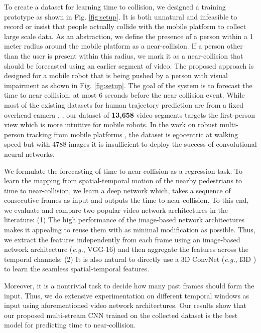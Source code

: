 To create a dataset for learning time to collision, we designed a training prototype as shown in Fig. \ref{fig:setup}. It is both unnatural and infeasible to record or insist that people actually collide with the mobile platform to collect large scale data. As an abstraction, we define the presence of a person within a 1 meter radius around the mobile platform as a near-collision. If a person other than the user is present within this radius, we mark it as a near-collision that should be forecasted using an earlier segment of video. The proposed approach is designed for a mobile robot that is being pushed by a person with visual impairment as shown in Fig. \ref{fig:setup}. The goal of the system is to forecast the time to near collision, at most 6 seconds before the near collision event. While most of the existing datasets for human trajectory prediction are from a fixed overhead camera \cite{2009YoullNW}, \cite{UCY}, our dataset of \textbf{13,658} video segments targets the first-person view which is more intuitive for mobile robots. In the work on robust multi-person tracking from mobile platforms \cite{Andreas}, the dataset is egocentric at walking speed but with 4788 images it is insufficient to deploy the success of convolutional neural networks. 


We formulate the forecasting of time to near-collision as a regression task. To learn the mapping from spatial-temporal motion of the nearby pedestrians to time to near-collision, we learn a deep network which, takes a sequence of consecutive frames as input and outputs the time to near-collision. To this end, we evaluate and compare two popular video network architectures in the literature: (1) The high performance of the image-based network architectures makes it appealing to reuse them with as minimal modification as possible. Thus, we extract the features independently from each frame using an image-based network architecture (\emph{e.g.}, VGG-16) and then aggregate the features across the temporal channels; (2) It is also natural to directly use a 3D ConvNet (\emph{e.g.}, I3D \cite{i3d}) to learn the seamless spatial-temporal features.

Moreover, it is a nontrivial task to decide how many past frames should form the input. Thus, we do extensive experimentation on different temporal windows as input using aforementioned video network architectures. Our results show that our proposed multi-stream CNN trained on the collected dataset is the best model for predicting time to near-collision.


